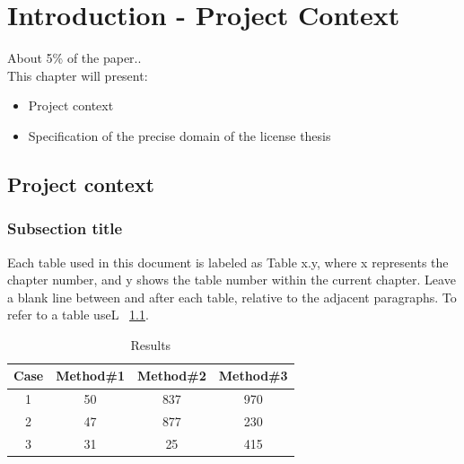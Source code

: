 \chapter{Introduction - Project Context}\label{ch:context}
\pagestyle{fancy}

{\color{blue}\noindent About 5\% of the paper..\\}
\noindent This chapter will present:

\begin{itemize}
	\item Project context
	\item Specification of the precise domain of the license thesis
\end{itemize}




\section{Project context}\label{sec:context}

\subsection{Subsection title}

Each table used in this document is labeled as Table x.y, where x represents the chapter number, and y shows the table number within the current chapter. Leave a blank line between and after each table, relative to the adjacent paragraphs.
To refer to a table useL ~\ref{tab:nonlin}.

\begin{table}[ht]
	\caption{Results}
	\centering                          %
	\begin{tabular}{|c|c|c|c|}          %
		\hline
		Case & Method\#1 & Method\#2 & Method\#3 \\ [0.5ex]   %
		\hline                              %
		1 & 50 & 837 & 970 \\               %
		2 & 47 & 877 & 230 \\
		3 & 31 & 25 & 415 \\[1ex]           %
		\hline                              
	\end{tabular}
	\label{tab:nonlin}                %
\end{table}

